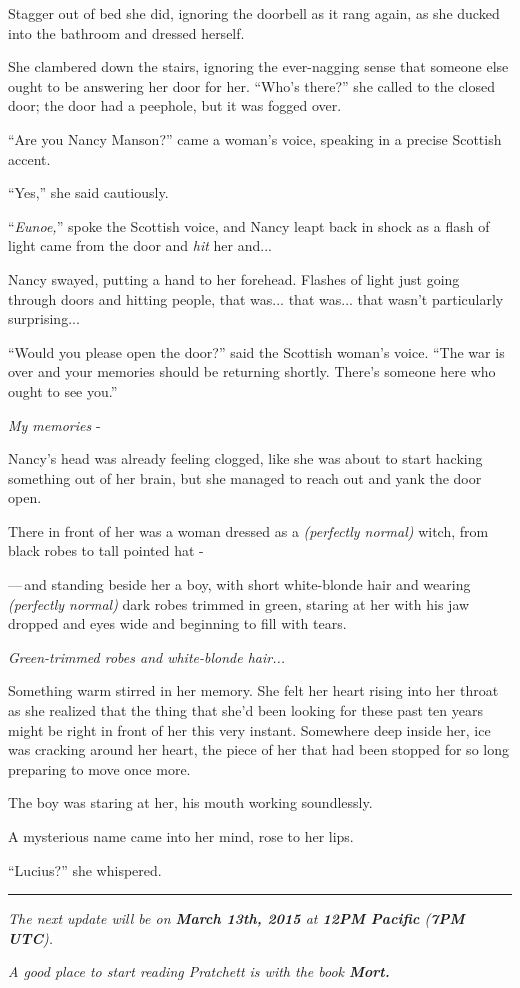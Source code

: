 Stagger out of bed she did, ignoring the doorbell as it rang again, as she ducked into the bathroom and dressed herself.

She clambered down the stairs, ignoring the ever-nagging sense that someone else ought to be answering her door for her. ``Who's there?'' she called to the closed door; the door had a peephole, but it was fogged over.

``Are you Nancy Manson?'' came a woman's voice, speaking in a precise Scottish accent.

``Yes,'' she said cautiously.

``\emph{Eunoe,}'' spoke the Scottish voice, and Nancy leapt back in shock as a flash of light came from the door and \emph{hit} her and...

Nancy swayed, putting a hand to her forehead. Flashes of light just going through doors and hitting people, that was... that was... that wasn't particularly surprising...

``Would you please open the door?'' said the Scottish woman's voice. ``The war is over and your memories should be returning shortly. There's someone here who ought to see you.''

\emph{My memories} -

Nancy's head was already feeling clogged, like she was about to start hacking something out of her brain, but she managed to reach out and yank the door open.

There in front of her was a woman dressed as a \emph{(perfectly normal)} witch, from black robes to tall pointed hat -

---\,and standing beside her a boy, with short white-blonde hair and wearing \emph{(perfectly normal)} dark robes trimmed in green, staring at her with his jaw dropped and eyes wide and beginning to fill with tears.

\emph{Green-trimmed robes and white-blonde hair...}

Something warm stirred in her memory. She felt her heart rising into her throat as she realized that the thing that she'd been looking for these past ten years might be right in front of her this very instant. Somewhere deep inside her, ice was cracking around her heart, the piece of her that had been stopped for so long preparing to move once more.

The boy was staring at her, his mouth working soundlessly.

A mysterious name came into her mind, rose to her lips.

``Lucius?'' she whispered.

\begin{center}\rule{3in}{0.4pt}\end{center}

\emph{The next update will be on \textbf{March 13th, 2015} at \textbf{12PM Pacific} (\textbf{7PM UTC}).}

\emph{A good place to start reading Pratchett is with the book \textbf{Mort.}}
